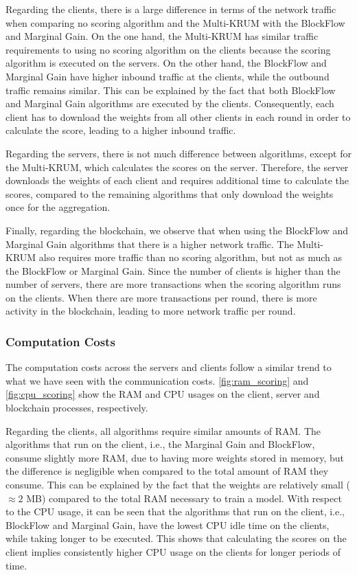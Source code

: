 Regarding the clients, there is a large difference in terms of the network traffic when comparing no scoring algorithm and the Multi-KRUM with the BlockFlow and Marginal Gain. On the one hand, the Multi-KRUM has similar traffic requirements to using no scoring algorithm on the clients because the scoring algorithm is executed on the servers. On the other hand, the BlockFlow and Marginal Gain have higher inbound traffic at the clients, while the outbound traffic remains similar. This can be explained by the fact that both BlockFlow and Marginal Gain algorithms are executed by the clients. Consequently, each client has to download the weights from all other clients in each round in order to calculate the score, leading to a higher inbound traffic.

Regarding the servers, there is not much difference between algorithms, except for the Multi-KRUM, which calculates the scores on the server. Therefore, the server downloads the weights of each client and requires additional time to calculate the scores, compared to the remaining algorithms that only download the weights once for the aggregation.

Finally, regarding the blockchain, we observe that when using the BlockFlow and Marginal Gain algorithms that there is a higher network traffic. The Multi-KRUM also requires more traffic than no scoring algorithm, but not as much as the BlockFlow or Marginal Gain. Since the number of clients is higher than the number of servers, there are more transactions when the scoring algorithm runs on the clients. When there are more transactions per round, there is more activity in the blockchain, leading to more network traffic per round.

\subsubsection{Computation Costs}

The computation costs across the servers and clients follow a similar trend to what we have seen with the communication costs. \autoref{fig:ram_scoring} and \autoref{fig:cpu_scoring} show the RAM and CPU usages on the client, server and blockchain processes, respectively.

Regarding the clients, all algorithms require similar amounts of RAM. The algorithms that run on the client, i.e., the Marginal Gain and BlockFlow, consume slightly more RAM, due to having more weights stored in memory, but the difference is negligible when compared to the total amount of RAM they consume. This can be explained by the fact that the weights are relatively small ($\approx 2$ MB) compared to the total RAM necessary to train a model. With respect to the CPU usage, it can be seen that the algorithms that run on the client, i.e., BlockFlow and Marginal Gain, have the lowest CPU idle time on the clients, while taking longer to be executed. This shows that calculating the scores on the client implies consistently higher CPU usage on the clients for longer periods of time.

